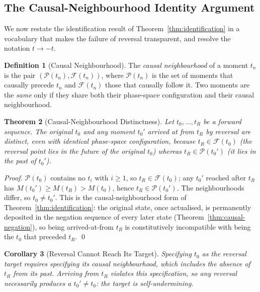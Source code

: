 \documentclass[twocolumn,10pt,a4paper]{article}
\theoremstyle{thmstyle}
\newtheorem{theorem}{Theorem}[section]
\newtheorem{corollary}[theorem]{Corollary}
\theoremstyle{definition}
\newtheorem{definition}[theorem]{Definition}
\theoremstyle{remark}
\begin{document}
\subsection{The Causal-Neighbourhood Identity Argument}
\label{sec:causal-nbhd}

We now restate the identification result of Theorem~\ref{thm:identification} in
a vocabulary that makes the failure of reversal transparent, and resolve the
notation $t \to -t$.

\begin{definition}[Causal Neighbourhood]
\label{def:causal-nbhd}
The \emph{causal neighbourhood} of a moment $t_n$ is the pair
$(\mathcal{P}(t_n), \mathcal{F}(t_n))$, where $\mathcal{P}(t_n)$ is the set of
moments that causally precede $t_n$ and $\mathcal{F}(t_n)$ those that causally
follow it. Two moments are the \emph{same} only if they share both their
phase-space configuration and their causal neighbourhood.
\end{definition}

\begin{theorem}[Causal-Neighbourhood Distinctness]
\label{thm:causal-distinct}
Let $t_0,\ldots,t_R$ be a forward sequence. The original $t_0$ and any moment
$t_0'$ arrived at from $t_R$ by reversal are distinct, even with identical
phase-space configuration, because $t_R \in \mathcal{F}(t_0)$ (the reversal
point lies in the \emph{future} of the original $t_0$) whereas
$t_R \in \mathcal{P}(t_0')$ (it lies in the \emph{past} of $t_0'$).
\end{theorem}

\begin{proof}
$\mathcal{P}(t_0)$ contains no $t_i$ with $i\ge 1$, so $t_R\in\mathcal{F}(t_0)$;
any $t_0'$ reached after $t_R$ has $M(t_0')\ge M(t_R)>M(t_0)$, hence
$t_R\in\mathcal{P}(t_0')$. The neighbourhoods differ, so $t_0\neq t_0'$. This is
the causal-neighbourhood form of Theorem~\ref{thm:identification}: the original
state, once actualised, is permanently deposited in the negation sequence of
every later state (Theorem~\ref{thm:causal-negation}), so being arrived-at-from
$t_R$ is constitutively incompatible with being the $t_0$ that preceded $t_R$.
\qed
\end{proof}

\begin{corollary}[Reversal Cannot Reach Its Target]
\label{cor:no-target}
Specifying $t_0$ as the reversal target requires specifying its causal
neighbourhood, which includes the \emph{absence} of $t_R$ from its past.
Arriving from $t_R$ violates this specification, so any reversal necessarily
produces a $t_0'\neq t_0$: the target is self-undermining.
\end{corollary}
\end{document}
